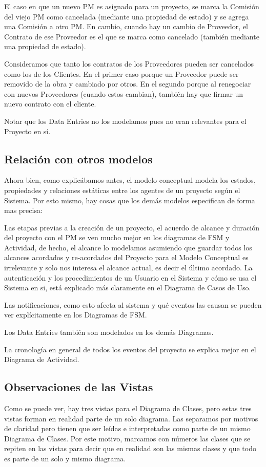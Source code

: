 El caso en que un nuevo PM es asignado para un proyecto, se marca la Comisión del viejo PM como cancelada (mediante una propiedad de estado) y se agrega una Comisión a otro PM. En cambio, cuando hay un cambio de Proveedor, el Contrato de ese Proveedor es el que se marca como cancelado (también mediante una propiedad de estado).

Consideramos que tanto los contratos de los Proveedores pueden ser cancelados como los de los Clientes. En el primer caso porque un Proveedor puede ser removido de la obra y cambiado por otros. En el segundo porque al renegociar con nuevos Proveedores (cuando estos cambian), también hay que firmar un nuevo contrato con el cliente.

Notar que los Data Entries no los modelamos pues no eran relevantes para el Proyecto en sí.

\subsection{Relación con otros modelos}
Ahora bien, como explicábamos antes, el modelo conceptual modela los estados, propiedades y relaciones estáticas entre los agentes de un proyecto según el Sistema. Por esto mismo, hay cosas que los demás modelos especifican de forma mas precisa:

Las etapas previas a la creación de un proyecto, el acuerdo de alcance y duración del proyecto con el PM se ven mucho mejor en los diagramas de FSM y Actividad, de hecho, el alcance lo modelamos asumiendo que guardar todos los alcances acordados y re-acordados del Proyecto para el Modelo Conceptual es irrelevante y solo nos interesa el alcance actual, es decir el último acordado.
La autenticación y los procedimientos de un Usuario en el Sistema y cómo se usa el Sistema en si, está explicado más claramente en el Diagrama de Casos de Uso.

Las notificaciones, como esto afecta al sistema y qué eventos las causan se pueden ver explícitamente en los Diagramas de FSM. 

Los Data Entries también son modelados en los demás Diagramas. 

La cronología en general de todos los eventos del proyecto se explica mejor en el Diagrama de Actividad.


\subsection{Observaciones de las Vistas}
Como se puede ver, hay tres vistas para el Diagrama de Clases, pero estas tres vistas forman en realidad parte de un solo diagrama. Las separamos por motivos de claridad pero tienen que ser leídas e interpretadas como parte de un mismo Diagrama de Clases. Por este motivo, marcamos con números las clases que se repiten en las vistas para decir que en realidad son las mismas clases y que todo es parte de un solo y mismo diagrama.

